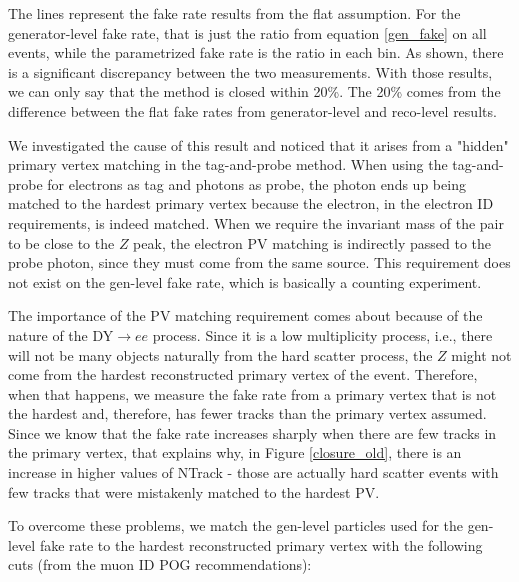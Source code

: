 
The lines represent the fake rate results from the flat assumption. For the generator-level fake rate, that is just the ratio from equation \ref{gen_fake} on all events, while the parametrized fake rate is the ratio in each bin. As shown, there is a significant discrepancy between the two measurements. With those results, we can only say that the method is closed within 20\%. The 20\% comes from the difference between the flat fake rates from generator-level and reco-level results.

We investigated the cause of this result and noticed that it arises from a "hidden" primary vertex matching in the tag-and-probe method. When using the tag-and-probe for electrons as tag and photons as probe, the photon ends up being matched to the hardest primary vertex because the electron, in the electron ID requirements, is indeed matched. When we require the invariant mass of the pair to be close to the $Z$ peak, the electron PV matching is indirectly passed to the probe photon, since they must come from the same source. This requirement does not exist on the gen-level fake rate, which is basically a counting experiment.

The importance of the PV matching requirement comes about because of the nature of the DY$\to ee$ process. Since it is a low multiplicity process, i.e., there will not be many objects naturally from the hard scatter process, the $Z$ might not come from the hardest reconstructed primary vertex of the event. Therefore, when that happens, we measure the fake rate from a  primary vertex that is not the hardest and, therefore, has fewer tracks than the primary vertex assumed. Since we know that the fake rate increases sharply when there are few tracks in the primary vertex, that explains why, in Figure \ref{closure_old}, there is an increase in higher values of NTrack - those are actually hard scatter events with few tracks that were mistakenly matched to the hardest PV.

To overcome these problems, we match the gen-level particles used for the gen-level fake rate to the hardest reconstructed primary vertex with the following cuts (from the muon ID POG recommendations):

